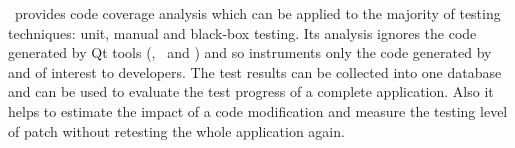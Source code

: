   \TestCocoon\ provides code coverage analysis which can be applied to
the majority of testing techniques: unit, manual and
black-box testing. Its analysis ignores the code generated by Qt tools 
(\moc, \qrc\ and \uic) and so instruments only the code generated by and of interest to
developers. The test results can be collected into one database
and can be used to evaluate the test progress of a complete application.
Also it helps to estimate the impact of a code
modification and measure the testing level of patch without retesting
the whole application again.

